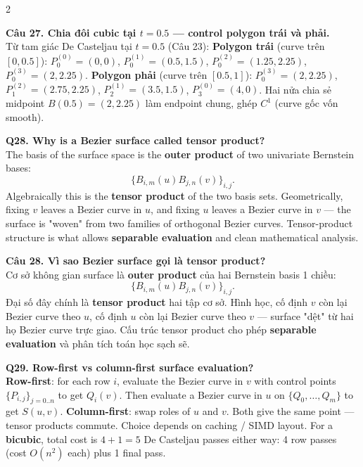 \begin{paracol}{2}
\switchcolumn

\textbf{Câu 27. Chia đôi cubic tại $t=0.5$ — control polygon trái và phải.}\\
Từ tam giác De Casteljau tại $t=0.5$ (Câu 23):
\textbf{Polygon trái} (curve trên $[0, 0.5]$): $P_0^{(0)}=(0,0)$, $P_0^{(1)}=(0.5,1.5)$, $P_0^{(2)}=(1.25,2.25)$, $P_0^{(3)}=(2,2.25)$.
\textbf{Polygon phải} (curve trên $[0.5, 1]$): $P_0^{(3)}=(2,2.25)$, $P_1^{(2)}=(2.75,2.25)$, $P_2^{(1)}=(3.5,1.5)$, $P_3^{(0)}=(4,0)$.
Hai nửa chia sẻ midpoint $B(0.5)=(2, 2.25)$ làm endpoint chung, ghép $C^1$ (curve gốc vốn smooth).

\switchcolumn*

\textbf{Q28. Why is a Bezier surface called tensor product?}\\
The basis of the surface space is the \textbf{outer product} of two univariate Bernstein bases:
\[ \{B_{i,m}(u) B_{j,n}(v)\}_{i,j}. \]
Algebraically this is the \textbf{tensor product} of the two basis sets. Geometrically, fixing $v$ leaves a Bezier curve in $u$, and fixing $u$ leaves a Bezier curve in $v$ — the surface is "woven" from two families of orthogonal Bezier curves. Tensor-product structure is what allows \textbf{separable evaluation} and clean mathematical analysis.

\switchcolumn

\textbf{Câu 28. Vì sao Bezier surface gọi là tensor product?}\\
Cơ sở không gian surface là \textbf{outer product} của hai Bernstein basis 1 chiều:
\[ \{B_{i,m}(u) B_{j,n}(v)\}_{i,j}. \]
Đại số đây chính là \textbf{tensor product} hai tập cơ sở. Hình học, cố định $v$ còn lại Bezier curve theo $u$, cố định $u$ còn lại Bezier curve theo $v$ — surface "dệt" từ hai họ Bezier curve trực giao. Cấu trúc tensor product cho phép \textbf{separable evaluation} và phân tích toán học sạch sẽ.

\switchcolumn*

\textbf{Q29. Row-first vs column-first surface evaluation?}\\
\textbf{Row-first}: for each row $i$, evaluate the Bezier curve in $v$ with control points $\{P_{i,j}\}_{j=0..n}$ to get $Q_i(v)$. Then evaluate a Bezier curve in $u$ on $\{Q_0,\ldots,Q_m\}$ to get $S(u,v)$. \textbf{Column-first}: swap roles of $u$ and $v$. Both give the same point — tensor products commute. Choice depends on caching / SIMD layout. For a \textbf{bicubic}, total cost is $4+1=5$ De Casteljau passes either way: 4 row passes (cost $O(n^2)$ each) plus 1 final pass.


\end{paracol}
